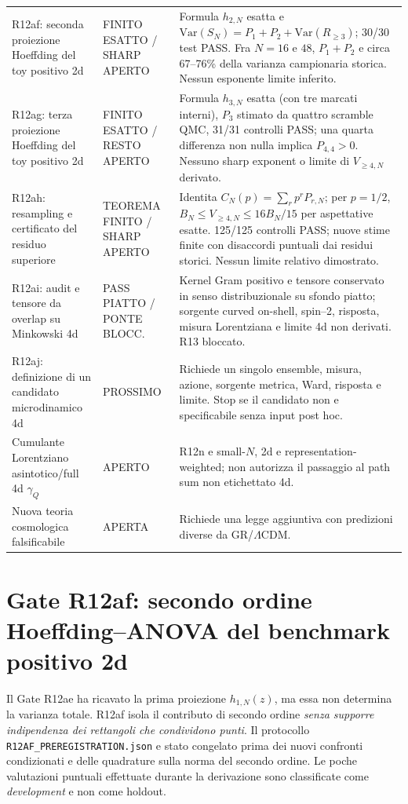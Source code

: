 \documentclass[11pt,a4paper]{article}
\newcommand{\LCDM}{\ensuremath{\Lambda\mathrm{CDM}}}
\newcommand{\status}[1]{\textsf{#1}}
\begin{document}
\begin{longtable}{p{}p{}p{}}
\addlinespace
R12af: seconda proiezione Hoeffding del toy positivo 2d & \status{FINITO ESATTO / SHARP APERTO} & Formula $h_{2,N}$ esatta e $\mathrm{Var}(S_N)=P_1+P_2+\mathrm{Var}(R_{\ge3})$; 30/30 test PASS. Fra $N=16$ e $48$, $P_1+P_2$ e circa 67--76\% della varianza campionaria storica. Nessun esponente limite inferito. \\
\addlinespace
R12ag: terza proiezione Hoeffding del toy positivo 2d & \status{FINITO ESATTO / RESTO APERTO} & Formula $h_{3,N}$ esatta (con tre marcati interni), $P_3$ stimato da quattro scramble QMC, 31/31 controlli PASS; una quarta differenza non nulla implica $P_{4,4}>0$. Nessuno sharp exponent o limite di $V_{\ge4,N}$ derivato. \\ 
\addlinespace
R12ah: resampling e certificato del residuo superiore & \status{TEOREMA FINITO / SHARP APERTO} & Identita $C_N(p)=\sum_rp^rP_{r,N}$; per $p=1/2$, $B_N\le V_{\ge4,N}\le16B_N/15$ per aspettative esatte. 125/125 controlli PASS; nuove stime finite con disaccordi puntuali dai residui storici. Nessun limite relativo dimostrato. \\
\addlinespace
R12ai: audit e tensore da overlap su Minkowski 4d & \status{PASS PIATTO / PONTE BLOCC.} & Kernel Gram positivo e tensore conservato in senso distribuzionale su sfondo piatto; sorgente curved on-shell, spin--2, risposta, misura Lorentziana e limite 4d non derivati. R13 bloccato. \\
\addlinespace
R12aj: definizione di un candidato microdinamico 4d & \status{PROSSIMO} & Richiede un singolo ensemble, misura, azione, sorgente metrica, Ward, risposta e limite. Stop se il candidato non e specificabile senza input post hoc. \\
\addlinespace
Cumulante Lorentziano asintotico/full 4d $\gamma_Q$ & \status{APERTO} & R12n e small-$N$, 2d e representation-weighted; non autorizza il passaggio al path sum non etichettato 4d. \\
\addlinespace
Nuova teoria cosmologica falsificabile & \status{APERTA} & Richiede una legge aggiuntiva con predizioni diverse da GR/\LCDM. \\
\bottomrule
\end{longtable}

\section{Gate R12af: secondo ordine Hoeffding--ANOVA del benchmark positivo 2d}
\label{sec:r12af}

Il Gate R12ae ha ricavato la prima proiezione $h_{1,N}(z)$, ma essa non determina la varianza totale. R12af isola il contributo di secondo ordine \emph{senza supporre indipendenza dei rettangoli che condividono punti}. Il protocollo \texttt{R12AF\_PREREGISTRATION.json} e stato congelato prima dei nuovi confronti condizionati e delle quadrature sulla norma del secondo ordine. Le poche valutazioni puntuali effettuate durante la derivazione sono classificate come \emph{development} e non come holdout.
\end{document}
